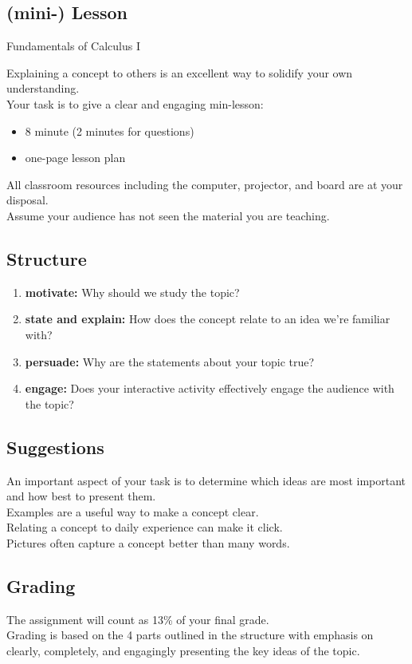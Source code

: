 \documentclass[a4paper, 12pt]{article}
\title{}
\date{}
\newcommand{\bt}[1]{\textbf{#1}} %
\begin{document}
\begin{center}
\section*{(mini-) Lesson}
Fundamentals of Calculus I
\end{center}

Explaining	a	concept	to	others	is	an	excellent	way	to	solidify	your	own	understanding.\\

Your task is to give a clear and engaging min-lesson: 
\begin{itemize}
    \item 8 minute (2 minutes for questions)
    \item one-page lesson plan 
\end{itemize}

All classroom resources including the computer, projector, and board are at your disposal.\\

Assume your audience has not seen the material you are teaching.


\subsection*{Structure}
\begin{enumerate}
    \item \bt{motivate:} Why should we study the topic?
    \item \bt{state and explain:} How does the concept relate to an idea we're familiar with?
    \item \bt{persuade:} Why are the statements about your topic true?
    \item \bt{engage:} Does your interactive activity effectively engage the audience with the topic?
\end{enumerate}

\subsection*{Suggestions}
An important aspect of your task is to determine which ideas are most important and how best to present them.\\

\noindent Examples are a useful way to make a concept clear.\\
Relating a concept to daily experience can make it click. \\
Pictures often capture a concept better than many words. \\


\subsection*{Grading}
The assignment will count as 13\% of your final grade.\\

\noindent Grading is based on the 4 parts outlined in the structure with emphasis on clearly, completely, and engagingly presenting the key ideas of the topic.
\end{document}
